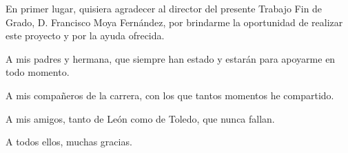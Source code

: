 \begin{agradecimientos}

    \itshape

    En primer lugar, quisiera agradecer al director del presente Trabajo Fin de Grado, D. Francisco Moya Fernández, por brindarme la oportunidad de realizar este proyecto  y por la ayuda ofrecida.
    
    A mis padres y hermana, que siempre han estado y estarán para apoyarme en todo momento.

    A mis compañeros de la carrera, con los que tantos momentos he compartido.

    A mis amigos, tanto de León como de Toledo, que nunca fallan.

    A todos ellos, muchas gracias.
 
\end{agradecimientos}